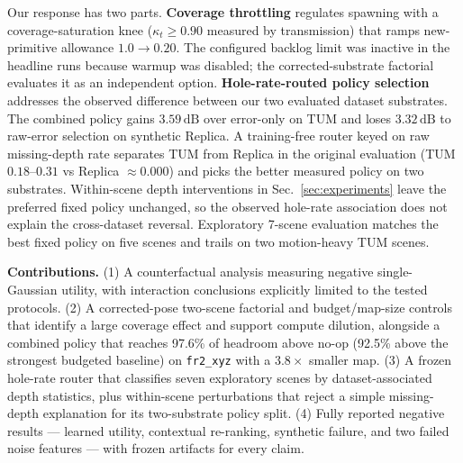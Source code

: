 \documentclass[10pt,twocolumn,letterpaper]{article}
\begin{document}
Our response has two parts.
\textbf{Coverage throttling} regulates spawning with a coverage-saturation knee ($\kappa_t \ge 0.90$ measured by transmission) that ramps new-primitive allowance $1.0 \to 0.20$. The configured backlog limit was inactive in the headline runs because warmup was disabled; the corrected-substrate factorial evaluates it as an independent option.
\textbf{Hole-rate-routed policy selection} addresses the observed difference between our two evaluated dataset substrates.
The combined policy gains $3.59\,\mathrm{dB}$ over error-only on TUM and loses $3.32\,\mathrm{dB}$ to raw-error selection on synthetic Replica.
A training-free router keyed on raw missing-depth rate separates TUM from Replica in the original evaluation (TUM $0.18$--$0.31$ vs Replica $\approx 0.000$) and picks the better measured policy on two substrates. Within-scene depth interventions in Sec.~\ref{sec:experiments} leave the preferred fixed policy unchanged, so the observed hole-rate association does not explain the cross-dataset reversal. Exploratory 7-scene evaluation matches the best fixed policy on five scenes and trails on two motion-heavy TUM scenes.

\textbf{Contributions.}
(1) A counterfactual analysis measuring negative single-Gaussian utility, with interaction conclusions explicitly limited to the tested protocols.
(2) A corrected-pose two-scene factorial and budget/map-size controls that identify a large coverage effect and support compute dilution, alongside a combined policy that reaches 97.6\% of headroom above no-op (92.5\% above the strongest budgeted baseline) on \texttt{fr2\_xyz} with a $3.8\times$ smaller map.
(3) A frozen hole-rate router that classifies seven exploratory scenes by dataset-associated depth statistics, plus within-scene perturbations that reject a simple missing-depth explanation for its two-substrate policy split.
(4) Fully reported negative results --- learned utility, contextual re-ranking, synthetic failure, and two failed noise features --- with frozen artifacts for every claim.
\end{document}
